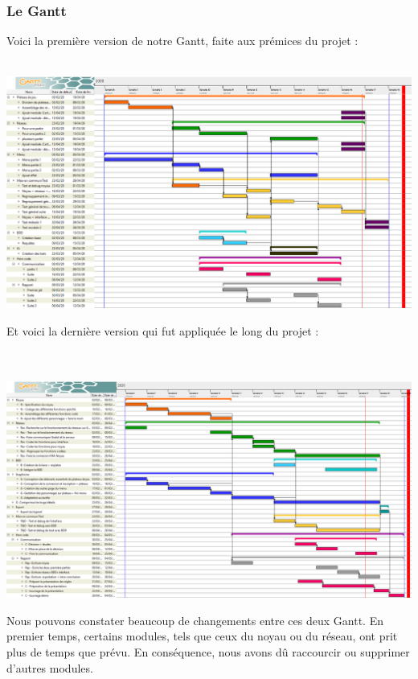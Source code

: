 \documentclass[a4paper,11pt]{article}
\begin{document}
\subsubsection{Le Gantt}
	Voici la première version de notre Gantt, faite aux prémices du projet :\\\\
\begin{center}
	\includegraphics[width=14cm]{Img/image6.png} \\
\end{center}


	Et voici la dernière version qui fut appliquée le long du projet : \\\\\\
\begin{center}
	\includegraphics[width=14cm]{Img/image2.png}
\end{center}


    Nous pouvons constater beaucoup de changements entre ces deux Gantt. En premier temps, certains modules, tels que ceux du noyau ou du réseau, ont prit plus de temps que prévu. En conséquence, nous avons dû raccourcir ou supprimer d’autres modules. \\
\end{document}
